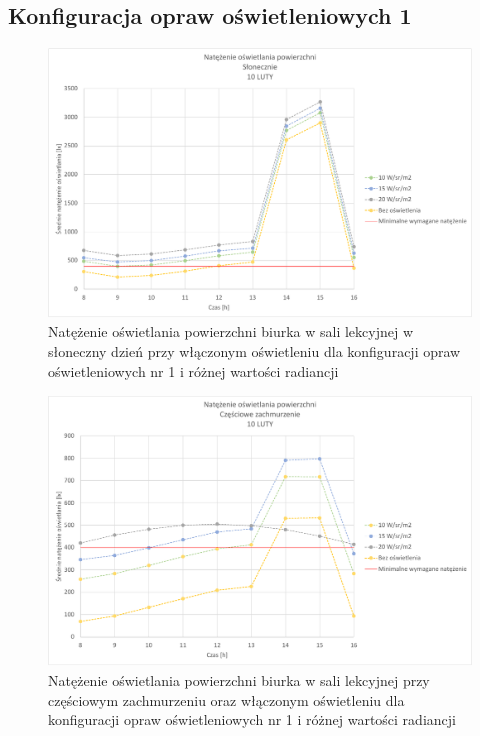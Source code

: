 \documentclass[a4paper,12pt]{article}
\begin{document}
	\subsection{Konfiguracja opraw oświetleniowych 1}
	\label{sec:oswietlenie_1}

	\begin{figure}[!ht]
		\centering
		\includegraphics[width=\linewidth]{Wykresy/oswietlenie_1_slonecznie.pdf}
		\caption{Natężenie oświetlania powierzchni biurka w sali lekcyjnej w słoneczny dzień przy włączonym oświetleniu dla konfiguracji opraw oświetleniowych nr 1 i różnej wartości radiancji}
		\label{oswietlenie_1_slonecznie}
	\end{figure}

	\begin{figure}[!ht]
		\centering
		\includegraphics[width=\linewidth]{Wykresy/oswietlenie_1_czesciowe_zachmurzenie.pdf}
		\caption{Natężenie oświetlania powierzchni biurka w sali lekcyjnej przy częściowym zachmurzeniu  oraz włączonym oświetleniu dla konfiguracji opraw oświetleniowych nr 1 i różnej wartości radiancji}
		\label{oswietlenie_1_czesciowe_zachmurzenie}
	\end{figure}
\end{document}
